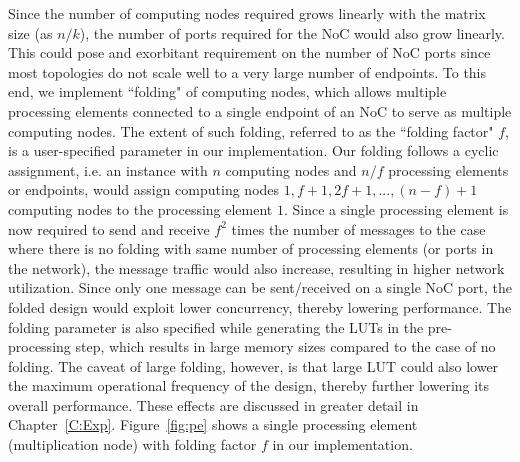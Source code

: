 \documentclass[conference, 9pt]{IEEEtran}
\begin{document}
Since the number of computing nodes required grows linearly with the matrix size (as $n/k$), the number of ports required for the NoC would also grow linearly. This could pose and exorbitant requirement on the number of NoC ports since most topologies do not scale well to a very large number of endpoints. To this end, we implement ``folding" of computing nodes,  which allows multiple processing elements connected to a single endpoint of an NoC to serve as multiple computing nodes. The extent of such folding, referred to as the ``folding factor" $f$, is a user-specified parameter in our implementation. Our folding follows a cyclic assignment, i.e. an instance with $n$ computing nodes and $n/f$ processing elements or endpoints, would assign computing nodes $1, f+1, 2f+1, ..., (n-f) + 1$ computing nodes to the processing element $1$. Since a single processing element is now required to send and receive $f^2$ times the number of messages to the case where there is no folding with same number of processing 
elements (or ports in the network), the message traffic would also increase, resulting in higher network utilization. Since only one message can be sent/received on a single NoC port, the folded design would exploit lower concurrency, thereby lowering performance. The folding parameter is also specified while generating the LUTs in the pre-processing step, which results in large memory sizes compared to the case of no folding. The caveat of large folding, however, is that large LUT could also lower the maximum operational frequency of the design, thereby further lowering its overall performance. These effects are discussed in greater detail in Chapter~\ref{C:Exp}. Figure~\ref{fig:pe} shows a single processing element (multiplication node) with folding factor $f$ in our implementation. \\
\end{document}
